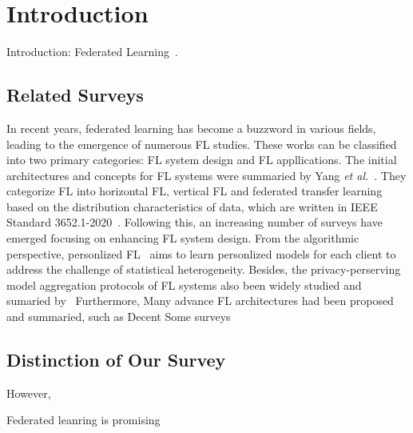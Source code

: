 \section{Introduction}
Introduction:
Federated Learning~\cite{li2020federated}.

\subsection{Related Surveys}
In recent years, federated learning has become a buzzword in various fields, leading to the emergence of numerous FL studies.
These works can be classified into two primary categories: FL system design and FL appllications. 
The initial architectures and concepts for FL systems were summaried by Yang \textit{et al.}~\cite{yang2019federated}. 
They categorize FL into horizontal FL, vertical FL and federated transfer learning based on the distribution characteristics of data, 
which are written in IEEE Standard 3652.1-2020~\cite{yang2021white, IEEEstd3652}. 
Following this, an increasing number of surveys have emerged focusing on enhancing FL system design. 
From the algorithmic perspective, personlized FL~\cite{tan2022towards, kulkarni2020survey} aims to learn personlized models for each client to address the challenge of statistical heterogeneity.
Besides, the privacy-perserving model aggregation protocols of FL systems also been widely studied and sumaried by~\cite{liu2022privacy,el2022differential,yin2021comprehensive,lyu2020threats}
Furthermore, Many advance FL architectures had been proposed and summaried, such as Decent
Some surveys 



\subsection{Distinction of Our Survey}
However,

Federated leanring is promising 

\begin{comment}
    ssssdd

\end{comment}
